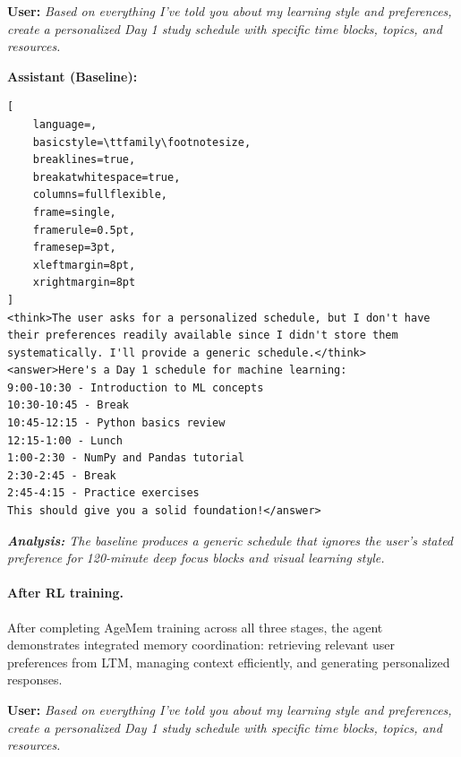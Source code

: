 \vspace{0.3cm}
\noindent\textbf{User:} \textit{Based on everything I've told you about my learning style and preferences, create a personalized Day 1 study schedule with specific time blocks, topics, and resources.}

\vspace{0.2cm}
\noindent\textbf{Assistant (Baseline):}
\begin{footnotesize}
\begin{lstlisting}[
    language=,
    basicstyle=\ttfamily\footnotesize,
    breaklines=true,
    breakatwhitespace=true,
    columns=fullflexible,
    frame=single,
    framerule=0.5pt,
    framesep=3pt,
    xleftmargin=8pt,
    xrightmargin=8pt
]
<think>The user asks for a personalized schedule, but I don't have their preferences readily available since I didn't store them systematically. I'll provide a generic schedule.</think>
<answer>Here's a Day 1 schedule for machine learning:
9:00-10:30 - Introduction to ML concepts
10:30-10:45 - Break  
10:45-12:15 - Python basics review
12:15-1:00 - Lunch
1:00-2:30 - NumPy and Pandas tutorial
2:30-2:45 - Break
2:45-4:15 - Practice exercises
This should give you a solid foundation!</answer>
\end{lstlisting}
\end{footnotesize}

\vspace{0.25cm}
\noindent\textit{\textbf{Analysis:} The baseline produces a generic schedule that ignores the user's stated preference for 120-minute deep focus blocks and visual learning style.}

\paragraph{After RL training.}
After completing AgeMem training across all three stages, the agent demonstrates integrated memory coordination: retrieving relevant user preferences from LTM, managing context efficiently, and generating personalized responses.

\vspace{0.3cm}
\noindent\textbf{User:} \textit{Based on everything I've told you about my learning style and preferences, create a personalized Day 1 study schedule with specific time blocks, topics, and resources.}

